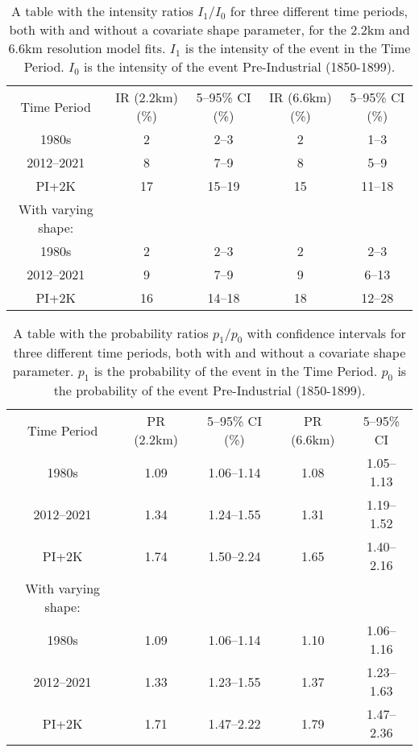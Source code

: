 \begin{table}[H]
   \centering
    \begin{tabular}{c c c c c}
        Time Period & IR (2.2km) (\%) & 5--95\% CI (\%) & IR (6.6km) (\%) & 5--95\% CI (\%) \\
        1980s & 2 & 2--3 & 2 & 1--3 \\
        2012--2021 & 8 & 7--9 & 8 & 5--9 \\
        PI+2K & 17 & 15--19 & 15 & 11--18 \\
        With varying shape: &&&& \\
        1980s & 2 & 2--3 & 2 & 2--3 \\
        2012--2021 & 9 & 7--9 & 9 & 6--13 \\
        PI+2K & 16 & 14--18 & 18 & 12--28 \\
    \end{tabular}
    \caption[Table~\ref{tab:irtable} fot 2.2km and 6.6km resolution model fits.]{
        A table with the intensity ratios $I_1/I_0$ for three different time periods,
        both with and without a covariate shape parameter,
        for the 2.2km and 6.6km resolution model fits.
    $I_1$ is the intensity of the event in the Time Period.
    $I_0$ is the intensity of the event Pre-Industrial (1850-1899).}
    \label{tab:13irtable}
\end{table}

\begin{table}[H]
   \centering
    \begin{tabular}{c c c c c}
        Time Period & PR (2.2km) & 5--95\% CI (\%) & PR (6.6km) & 5--95\% CI \\
        1980s & 1.09 & 1.06--1.14 & 1.08 & 1.05--1.13 \\
        2012--2021 & 1.34 & 1.24--1.55 & 1.31 & 1.19--1.52 \\
        PI+2K & 1.74 & 1.50--2.24 & 1.65 & 1.40--2.16 \\
        With varying shape: &&&& \\
        1980s & 1.09 & 1.06--1.14 & 1.10 & 1.06--1.16 \\
        2012--2021 & 1.33 & 1.23--1.55 & 1.37 & 1.23--1.63 \\
        PI+2K & 1.71 & 1.47--2.22 & 1.79 & 1.47--2.36 \\
    \end{tabular}
    \caption[Table~\ref{tab:prtable} for the 2.2km and 6.6km resolution model fits.]{
        A table with the probability ratios $p_1/p_0$ with confidence intervals for three different time periods,
        both with and without a covariate shape parameter.
    $p_1$ is the probability of the event in the Time Period.
    $p_0$ is the probability of the event Pre-Industrial (1850-1899).}
    \label{tab:13prtable}
\end{table}

